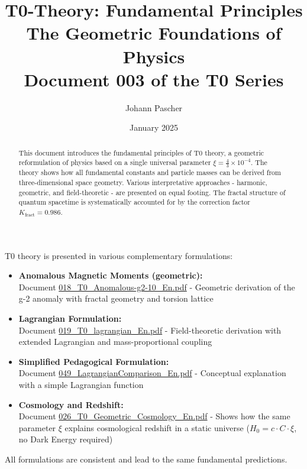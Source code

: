 \documentclass[12pt,a4paper]{article}
\title{\textbf{T0-Theory: Fundamental Principles}\\[0.5cm]
	 The Geometric Foundations of Physics\\[0.3cm]
	\normalsize Document 003 of the T0 Series}
\author{Johann Pascher}
\date{January 2025}
\begin{document}
	
	\maketitle
	
	\begin{abstract}
		This document introduces the fundamental principles of T0 theory, a geometric reformulation of physics based on a single universal parameter $\xi = \frac{4}{3} \times 10^{-4}$. The theory shows how all fundamental constants and particle masses can be derived from three-dimensional space geometry. Various interpretative approaches - harmonic, geometric, and field-theoretic - are presented on equal footing. The fractal structure of quantum spacetime is systematically accounted for by the correction factor $K_{\text{fract}} = 0.986$.
	\end{abstract}
	
	\begin{tcolorbox}[colback=blue!10!white, colframe=blue!75!black, title=References to Complementary T0 Formulations]
		T0 theory is presented in various complementary formulations:
		
		\begin{itemize}
			\item \textbf{Anomalous Magnetic Moments (geometric):} \\
			Document \href{https://github.com/jpascher/T0-Time-Mass-Duality/blob/main/2/pdf/018_T0_Anomalous-g2-10_En.pdf}{018\_T0\_Anomalous-g2-10\_En.pdf} - 
			Geometric derivation of the g-2 anomaly with fractal geometry and torsion lattice
			
			\item \textbf{Lagrangian Formulation:} \\
			Document \href{https://github.com/jpascher/T0-Time-Mass-Duality/blob/main/2/pdf/019_T0_lagrangian_En.pdf}{019\_T0\_lagrangian\_En.pdf} - 
			Field-theoretic derivation with extended Lagrangian and mass-proportional coupling
			
			\item \textbf{Simplified Pedagogical Formulation:} \\
			Document \href{https://github.com/jpascher/T0-Time-Mass-Duality/blob/main/2/pdf/049_LagrangianComparison_En.pdf}{049\_LagrangianComparison\_En.pdf} - 
			Conceptual explanation with a simple Lagrangian function
			
			\item \textbf{Cosmology and Redshift:} \\
			Document \href{https://github.com/jpascher/T0-Time-Mass-Duality/blob/main/2/pdf/026_T0_Geometric_Cosmology_En.pdf}{026\_T0\_Geometric\_Cosmology\_En.pdf} - 
			Shows how the same parameter $\xi$ explains cosmological redshift in a static universe ($H_0 = c \cdot C \cdot \xi$, no Dark Energy required)
		\end{itemize}
		
		All formulations are consistent and lead to the same fundamental predictions.
	\end{tcolorbox}
	
\end{document}
